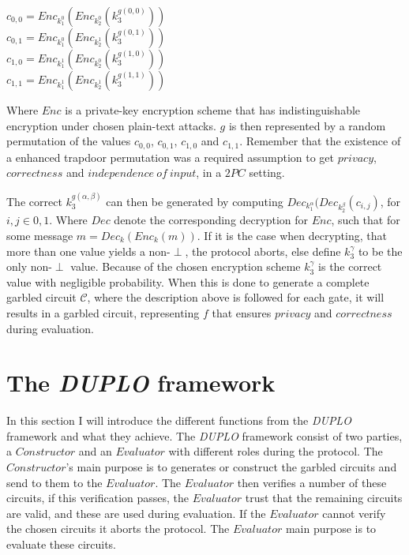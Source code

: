\documentclass[twoside,11pt,openright]{report}
\newcommand{\DUPLO}{\textit{DUPLO} }
\begin{document}
\begin{center}
    $c_{0,0} = Enc_{k^0_1}(Enc_{k^0_2}(k^{g(0,0)}_3))$    \\
    $c_{0,1} = Enc_{k^0_1}(Enc_{k^1_2}(k^{g(0,1)}_3))$    \\
    $c_{1,0} = Enc_{k^1_1}(Enc_{k^0_2}(k^{g(1,0)}_3))$    \\
    $c_{1,1} = Enc_{k^1_1}(Enc_{k^1_2}(k^{g(1,1)}_3))$    \\
\end{center}

Where $Enc$ is a private-key encryption scheme that has indistinguishable encryption under chosen plain-text attacks. $g$ is then represented by a random permutation of the values $c_{0,0}$, $c_{0,1}$, $c_{1,0}$ and $c_{1,1}$. Remember that the existence of a enhanced trapdoor permutation was a required assumption to get $privacy$, $correctness$ and $independence~of~input$, in a $2PC$ setting.

The correct $k^{g(\alpha,\beta)}_3$ can then be generated by computing $Dec_{k^\alpha_1}(Dec_{k^\beta_2}(c_{i,j})$, for $i,j\in{0,1}$. Where $Dec$ denote the corresponding decryption for $Enc$, such that for some message $m=Dec_k(Enc_k(m))$. If it is the case when decrypting, that more than one value yields a non-$\perp$, the protocol aborts, else define $k^\gamma_3$ to be the only non-$\perp$ value. Because of the chosen encryption scheme $k^\gamma_3$ is the correct value with negligible probability. When this is done to generate a complete garbled circuit $\mathcal{C}$, where the description above is followed for each gate, it will results in a garbled circuit, representing $f$ that ensures $privacy$ and $correctness$ during evaluation.


\section{The \DUPLO framework}
\label{sec:duplo_framework}
In this section I will introduce the different functions from the \DUPLO framework and what they achieve. The \DUPLO framework consist of two parties, a $Constructor$ and an $Evaluator$ with different roles during the protocol. The $Constructor$'s main purpose is to generates or construct the garbled circuits and send to them to the $Evaluator$. The $Evaluator$ then verifies a number of these circuits, if this verification passes, the $Evaluator$ trust that the remaining circuits are valid, and these are used during evaluation. If the $Evaluator$ cannot verify the chosen circuits it aborts the protocol. The $Evaluator$ main purpose is to evaluate these circuits.
\end{document}
